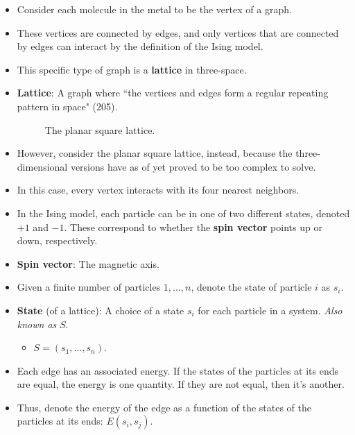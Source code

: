 \documentclass[titlepage]{article}
\numberwithin{figure}{section}
\numberwithin{table}{section}
\numberwithin{equation}{section}
\newcommand{\dq}[2]{``#1" (#2).}
\begin{document}
\begin{itemize}
    \item Consider each molecule in the metal to be the vertex of a graph.
    \item These vertices are connected by edges, and only vertices that are connected by edges can interact by the definition of the Ising model.
    \item This specific type of graph is a \textbf{lattice} in three-space.
    \item \textbf{Lattice}: A graph where \dq{the vertices and edges form a regular repeating pattern in space}{205}
    \begin{figure}[h!]
        \centering
        \caption{The planar square lattice.}
        \label{fig:2-lattice}
    \end{figure}
    \item However, consider the planar square lattice, instead, because the three-dimensional versions have as of yet proved to be too complex to solve.
    \item In this case, every vertex interacts with its four nearest neighbors.
    \item In the Ising model, each particle can be in one of two different states, denoted $+1$ and $-1$. These correspond to whether the \textbf{spin vector} points up or down, respectively.
    \item \textbf{Spin vector}: The magnetic axis.
    \item Given a finite number of particles $1,\dots,n$, denote the state of particle $i$ as $s_i$.
    \item \textbf{State} (of a lattice): A choice of a state $s_i$ for each particle in a system. \emph{Also known as} $S$.
    \begin{itemize}
        \item $S=\left( s_1,\dots,s_n \right)$.
    \end{itemize}
    \item Each edge has an associated energy. If the states of the particles at its ends are equal, the energy is one quantity. If they are not equal, then it's another.
    \item Thus, denote the energy of the edge as a function of the states of the particles at its ends: $E(s_i,s_j)$.

\end{itemize}
\end{document}
